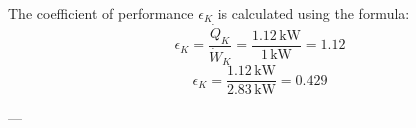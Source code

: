 The coefficient of performance \( \epsilon_K \) is calculated using the formula:  
\[
\epsilon_K = \frac{\dot{Q}_K}{\dot{W}_K} = \frac{1.12 \, \text{kW}}{1 \, \text{kW}} = 1.12
\]
\[
\epsilon_K = \frac{1.12 \, \text{kW}}{2.83 \, \text{kW}} = 0.429
\]

---